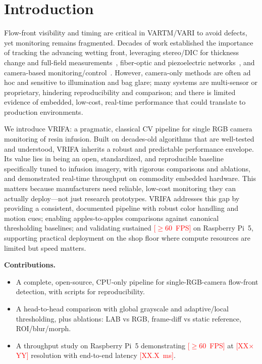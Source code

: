 \documentclass[twocolumn, 10pt]{article}
\newcommand{\placeholder}[1]{\textcolor{red}{[#1]}}
\begin{document}
\section{Introduction}
Flow-front visibility and timing are critical in VARTM/VARI to avoid defects, yet monitoring remains fragmented. Decades of work established the importance of tracking the advancing wetting front, leveraging stereo/DIC for thickness change and full-field measurements~\cite{govignon2008fullfield,govignonStereo}, fiber-optic and piezoelectric networks~\cite{vardistributedOptics,varPZT}, and camera-based monitoring/control~\cite{pineda2010avp,lekanidis2020vari}. However, camera-only methods are often ad hoc and sensitive to illumination and bag glare; many systems are multi-sensor or proprietary, hindering reproducibility and comparison; and there is limited evidence of embedded, low-cost, real-time performance that could translate to production environments.

We introduce VRIFA: a pragmatic, classical CV pipeline for single RGB camera monitoring of resin infusion. Built on decades-old algorithms that are well-tested and understood, VRIFA inherits a robust and predictable performance envelope. Its value lies in being an open, standardized, and reproducible baseline specifically tuned to infusion imagery, with rigorous comparisons and ablations, and demonstrated real-time throughput on commodity embedded hardware. This matters because manufacturers need reliable, low-cost monitoring they can actually deploy—not just research prototypes. VRIFA addresses this gap by providing a consistent, documented pipeline with robust color handling and motion cues; enabling apples-to-apples comparisons against canonical thresholding baselines; and validating sustained \placeholder{$\geq60$~FPS} on Raspberry Pi~5, supporting practical deployment on the shop floor where compute resources are limited but speed matters.

\textbf{Contributions.}
\begin{itemize}[leftmargin=*,noitemsep]
  \item A complete, open-source, CPU-only pipeline for single-RGB-camera flow-front detection, with scripts for reproducibility.
  \item A head-to-head comparison with global grayscale and adaptive/local thresholding, plus ablations: LAB vs RGB, frame-diff vs static reference, ROI/blur/morph.
  \item A throughput study on Raspberry Pi~5 demonstrating \placeholder{$\geq60$~FPS} at \placeholder{XX$\times$YY} resolution with end-to-end latency \placeholder{XX.X~ms}.
\end{itemize}
\end{document}

